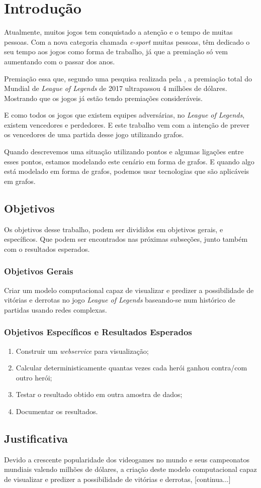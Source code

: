 \chapter{Introdução}
\label{chap:Introducao}

Atualmente, muitos jogos tem conquistado a atenção e o tempo de muitas pessoas. Com a nova categoria chamada \textit{e-sport} muitas pessoas, têm dedicado o seu tempo aos jogos como forma de trabalho, já que a premiação só vem aumentando com o passar dos anos.

Premiação essa que, segundo uma pesquisa realizada pela \citet{espn}, a premiação total do Mundial de \textit{League of Legends} de 2017 ultrapassou 4 milhões de dólares. Mostrando que os jogos já estão tendo premiações consideráveis.

E como todos os jogos que existem equipes adversárias, no \textit{League of Legends}, existem vencedores e perdedores. E este trabalho vem com a intenção de prever os vencedores de uma partida desse jogo utilizando grafos.

Quando descrevemos uma situação utilizando pontos e algumas ligações entre esses pontos, estamos modelando este cenário em forma de grafos. E quando algo está modelado em forma de grafos, podemos usar tecnologias que são aplicáveis em grafos.

\section{Objetivos}
Os objetivos desse trabalho, podem ser divididos em objetivos gerais, e específicos. Que podem ser encontrados nas próximas subseções, junto também com o resultados esperados.
\subsection{Objetivos Gerais}
Criar um modelo computacional capaz de visualizar e predizer a possibilidade de vitórias e derrotas no jogo \textit{League of Legends} baseando-se num histórico de partidas usando redes complexas.

\subsection{Objetivos Específicos e Resultados Esperados}

\begin{enumerate}
\item Construir um \textit{webservice} para visualização;
\item Calcular deterministicamente quantas vezes cada herói ganhou contra/com outro herói;
\item Testar o resultado obtido em outra amostra de dados;
\item Documentar os resultados.

\end{enumerate}

\section{Justificativa}
Devido a crescente popularidade dos videogames no mundo e seus campeonatos mundiais valendo milhões de dólares, a criação deste modelo computacional capaz de visualizar e predizer a possibilidade de vitórias e derrotas, [continua...]